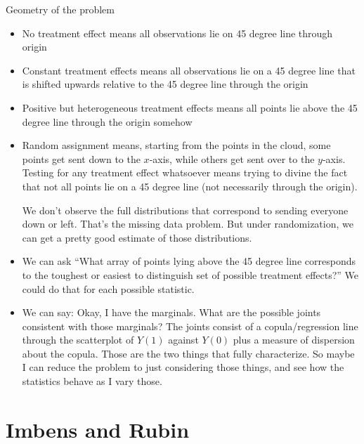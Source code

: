 \documentclass[12pt]{article}
\theoremstyle{plain}
\theoremstyle{definition}
\theoremstyle{remark}
\begin{document}
Geometry of the problem
\begin{itemize}
  \item No treatment effect means all observations lie on 45 degree line
    through origin
  \item Constant treatment effects means all observations lie on a 45
    degree line that is shifted upwards relative to the 45 degree line
    through the origin
  \item Positive but heterogeneous treatment effects means all points
    lie above the 45 degree line through the origin somehow
  \item Random assignment means, starting from the points in the cloud,
    some points get sent down to the $x$-axis, while others get sent
    over to the $y$-axis.
    Testing for any treatment effect whatsoever means trying to divine
    the fact that not all points lie on a 45 degree line (not
    necessarily through the origin).

    We don't observe the full distributions that correspond to sending
    everyone down or left.
    That's the missing data problem.
    But under randomization, we can get a pretty good estimate of those
    distributions.

  \item
    We can ask
    ``What array of points lying above the 45 degree line corresponds to
    the toughest or easiest to distinguish set of possible treatment
    effects?''
    We could do that for each possible statistic.

  \item
    We can say:
    Okay, I have the marginals.
    What are the possible joints consistent with those marginals?
    The joints consist of a copula/regression line through the
    scatterplot of $Y(1)$ against $Y(0)$ plus a measure of dispersion
    about the copula.
    Those are the two things that fully characterize.
    So maybe I can reduce the problem to just considering those things,
    and see how the statistics behave as I vary those.
\end{itemize}





\clearpage
\section{Imbens and Rubin}
\end{document}
